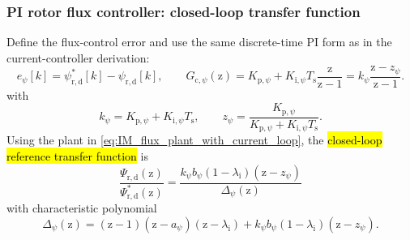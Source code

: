 \begin{frame}
    \frametitle{PI rotor flux controller: closed-loop transfer function}
    Define the flux-control error and use the same discrete-time PI form as in the current-controller derivation:
    \begin{equation}
        e_\psi[k]=\psi^{*}_{\mathrm{r,d}}[k]-\psi_{\mathrm{r,d}}[k],
        \qquad
        G_{\mathrm{c},\psi}(\mathrm{z})
        =K_{\mathrm{p},\psi}+K_{\mathrm{i},\psi}T_\mathrm{s}\frac{\mathrm{z}}{\mathrm{z}-1}
        =k_\psi\frac{\mathrm{z}-z_\psi}{\mathrm{z}-1} .
        \label{eq:IM_flux_PI}
    \end{equation}
    with
    \begin{equation}
        k_\psi=K_{\mathrm{p},\psi}+K_{\mathrm{i},\psi}T_\mathrm{s},
        \qquad
        z_\psi=\frac{K_{\mathrm{p},\psi}}{K_{\mathrm{p},\psi}+K_{\mathrm{i},\psi}T_\mathrm{s}} .
        \label{eq:IM_flux_PI_kz}
    \end{equation}\pause%
    Using the plant in \eqref{eq:IM_flux_plant_with_current_loop}, the \hl{closed-loop reference transfer function} is
    \begin{equation}
        \frac{\Psi_{\mathrm{r,d}}(\mathrm{z})}{\Psi^{*}_{\mathrm{r,d}}(\mathrm{z})}
        =\frac{k_\psi b_\psi(1-\lambda_\mathrm{i})(\mathrm{z}-z_\psi)}{\Delta_\psi(\mathrm{z})}
        \label{eq:IM_flux_closed_loop_tf}
    \end{equation}
    with characteristic polynomial
    \begin{equation}
        \Delta_\psi(\mathrm{z})
        =(\mathrm{z}-1)(\mathrm{z}-a_\psi)(\mathrm{z}-\lambda_\mathrm{i})
        +k_\psi b_\psi(1-\lambda_\mathrm{i})(\mathrm{z}-z_\psi).
        \label{eq:IM_flux_closed_loop_den_exact}
    \end{equation}
\end{frame}

